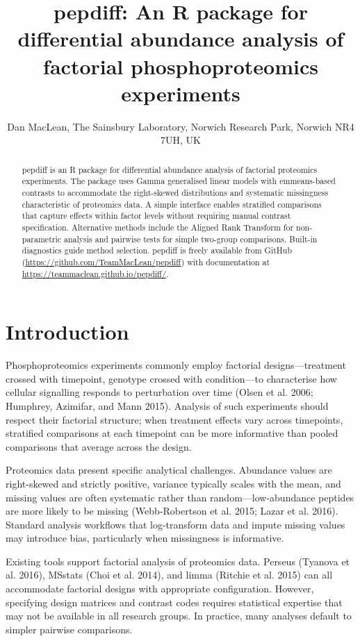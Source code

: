 \documentclass[
]{article}
\title{pepdiff: An R package for differential abundance analysis of
factorial phosphoproteomics experiments}
\author{Dan MacLean, The Sainsbury Laboratory, Norwich Research Park,
Norwich NR4 7UH, UK}
\date{}
\begin{document}
\maketitle
\begin{abstract}
pepdiff is an R package for differential abundance analysis of factorial
proteomics experiments. The package uses Gamma generalised linear models
with emmeans-based contrasts to accommodate the right-skewed
distributions and systematic missingness characteristic of proteomics
data. A simple interface enables stratified comparisons that capture
effects within factor levels without requiring manual contrast
specification. Alternative methods include the Aligned Rank Transform
for non-parametric analysis and pairwise tests for simple two-group
comparisons. Built-in diagnostics guide method selection. pepdiff is
freely available from GitHub
(\url{https://github.com/TeamMacLean/pepdiff}) with documentation at
\url{https://teammaclean.github.io/pepdiff/}.
\end{abstract}

\section{Introduction}\label{introduction}

Phosphoproteomics experiments commonly employ factorial
designs---treatment crossed with timepoint, genotype crossed with
condition---to characterise how cellular signalling responds to
perturbation over time (Olsen et al. 2006; Humphrey, Azimifar, and Mann
2015). Analysis of such experiments should respect their factorial
structure; when treatment effects vary across timepoints, stratified
comparisons at each timepoint can be more informative than pooled
comparisons that average across the design.

Proteomics data present specific analytical challenges. Abundance values
are right-skewed and strictly positive, variance typically scales with
the mean, and missing values are often systematic rather than
random---low-abundance peptides are more likely to be missing
(Webb-Robertson et al. 2015; Lazar et al. 2016). Standard analysis
workflows that log-transform data and impute missing values may
introduce bias, particularly when missingness is informative.

Existing tools support factorial analysis of proteomics data. Perseus
(Tyanova et al. 2016), MSstats (Choi et al. 2014), and limma (Ritchie et
al. 2015) can all accommodate factorial designs with appropriate
configuration. However, specifying design matrices and contrast codes
requires statistical expertise that may not be available in all research
groups. In practice, many analyses default to simpler pairwise
comparisons.
\end{document}
